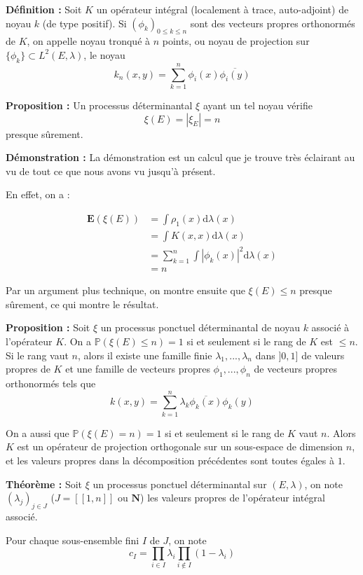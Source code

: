 \documentclass[12pt]{article}
\let\oldsum\sum
\renewcommand{\sum}{\oldsum\limits}
\begin{document}
\textbf{Définition :} Soit $K$ un opérateur intégral (localement à trace, auto-adjoint) de noyau $k$ (de type positif). Si $ (\phi_k)_{0 \leqslant k \leqslant n} $ sont des vecteurs propres orthonormés de $K$, on appelle noyau tronqué à $n$ points, ou noyau de projection sur $ \{ \phi_k \} \subset L^2(E, \lambda)$, le noyau $$ k_n(x,y) = \sum_{k = 1}^n \phi_i(x) \overline{\phi_i(y)} $$

\textbf{Proposition :} Un processus déterminantal $ \xi $ ayant un tel noyau vérifie $$ \xi(E) = |\xi_E| = n $$ presque sûrement.

\textbf{Démonstration :} La démonstration est un calcul que je trouve très éclairant au vu de tout ce que nous avons vu jusqu'à présent.

En effet, on a : 

\begin{align*} \mathbf E(\xi(E)) &= \int \rho_1(x) \mathrm d \lambda(x) \\ &= \int K(x,x) \mathrm d \lambda(x) \\ &= \sum_{k=1}^n \int |\phi_k(x)|^2 \mathrm d \lambda (x) \\ &= n \end{align*}

Par un argument plus technique, on montre ensuite que $ \xi(E) \leqslant n $ presque sûrement, ce qui montre le résultat.

\textbf{Proposition :} Soit $ \xi  $ un processus ponctuel déterminantal de noyau $k$ associé à l'opérateur $K$. On a $ \mathbb P(\xi(E) \leqslant n)  = 1 $ si et seulement si le rang de $ K $ est $ \leqslant n $. Si le rang vaut $n$, alors il existe une famille finie $ \lambda_1, ..., \lambda_n $ dans $ ]0,1]$ de valeurs propres de $K$ et une famille de vecteurs propres $ \phi_1,...,\phi_n$ de vecteurs propres orthonormés tels que $$ k(x,y) = \sum_{k=1}^n \lambda_k \overline{\phi_k(x)} \phi_k(y) $$

On a aussi que $ \mathbb P(\xi(E) = n)  = 1  $ si et seulement si le rang de $K$ vaut $n$. Alors $K$ est un opérateur de projection orthogonale sur un sous-espace de dimension $n$, et les valeurs propres dans la décomposition précédentes sont toutes égales à $1$.

\textbf{Théorème :} Soit $\xi$ un processus ponctuel déterminantal sur $(E, \lambda)$, on note $ (\lambda_j)_{j \in J} $ ($J = [\![1,n]\!]$ ou $\mathbf N$) les valeurs propres de l'opérateur intégral associé.

Pour chaque sous-ensemble fini $ I $ de $ J $, on note $$ c_I = \prod_{i \in I} \lambda_i \prod_{i \notin I} (1-\lambda_i)  $$
\end{document}
